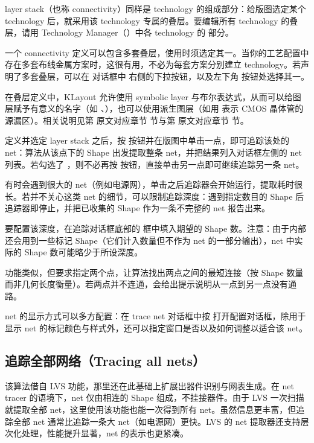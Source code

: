 layer stack（也称 connectivity）同样是 technology 的组成部分：给版图选定某个 technology 后，就采用该 technology 专属的叠层。要编辑所有 technology 的叠层，请用 Technology Manager（）中各 technology 的  部分。

一个 connectivity 定义可以包含多套叠层，使用时须选定其一。当你的工艺配置中存在多套布线金属方案时，这很有用，不必为每套方案分别建立 technology。若声明了多套叠层，可以在  对话框中  右侧的下拉按钮，以及左下角  按钮处选择其一。

在叠层定义中，KLayout 允许使用 symbolic layer 与布尔表达式，从而可以给图层赋予有意义的名字（如 、），也可以使用派生图层（如用  表示 CMOS 晶体管的源漏区）。相关说明见第 原文对应章节 节与第 原文对应章节 节。

定义并选定 layer stack 之后，按  按钮并在版图中单击一点，即可追踪该处的 net：算法从该点下的 Shape 出发提取整条 net，并把结果列入对话框左侧的 net 列表。若勾选了 ，则不必再按  按钮，直接单击另一点即可继续追踪另一条 net。

有时会遇到很大的 net（例如电源网），单击之后追踪器会开始运行，提取耗时很长。若并不关心这类 net 的细节，可以限制追踪深度：遇到指定数目的 Shape 后追踪器即停止，并把已收集的 Shape 作为一条不完整的 net 报告出来。

要配置该深度，在追踪对话框底部的  框中填入期望的 Shape 数。注意：由于内部还会用到一些标记 Shape（它们计入数量但不作为 net 的一部分输出），net 中实际的 Shape 数可能略少于所设深度。

 功能类似，但要求指定两个点，让算法找出两点之间的最短连接（按 Shape 数量而非几何长度衡量）。若两点并不连通，会给出提示说明从一点到另一点没有通路。

net 的显示方式可以多方配置：在 trace net 对话框中按  打开配置对话框，除用于显示 net 的标记颜色与样式外，还可以指定窗口是否以及如何调整以适合该 net。

\subsection{追踪全部网络（Tracing all nets）}

该算法借自 LVS 功能，那里还在此基础上扩展出器件识别与网表生成。在 net tracer 的语境下，net 仅由相连的 Shape 组成，不挂接器件。由于 LVS 一次扫描就提取全部 net，这里使用该功能也能一次得到所有 net。虽然信息更丰富，但追踪全部 net 通常比追踪一条大 net（如电源网）更快。LVS 的 net 提取器还支持层次化处理，性能提升显著，net 的表示也更紧凑。

